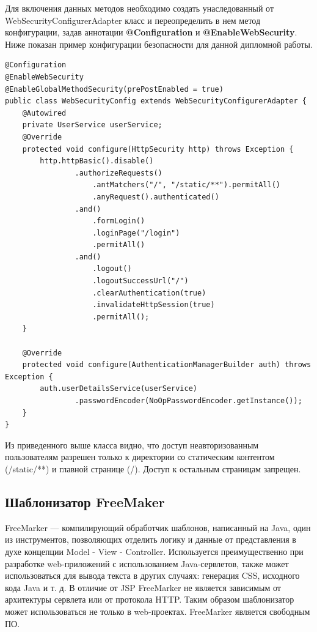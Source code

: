 \documentclass[a4paper]{article}
\begin{document}
Для включения данных методов необходимо создать унаследованный от WebSecurityConfigurerAdapter класс и переопределить в нем метод конфигурации, задав аннотации \textbf{@Configuration} и \textbf{@EnableWebSecurity}. Ниже показан пример конфигурации безопасности для данной дипломной работы.
\hfill\break
{}         
\begin{lstlisting}[label=lis8,caption=Класс настроек безопасности] 
@Configuration
@EnableWebSecurity
@EnableGlobalMethodSecurity(prePostEnabled = true)
public class WebSecurityConfig extends WebSecurityConfigurerAdapter {
    @Autowired
    private UserService userService;
    @Override
    protected void configure(HttpSecurity http) throws Exception {
        http.httpBasic().disable()
                .authorizeRequests()
                    .antMatchers("/", "/static/**").permitAll()
                    .anyRequest().authenticated()
                .and()
                    .formLogin()
                    .loginPage("/login")
                    .permitAll()
                .and()
                    .logout()
                    .logoutSuccessUrl("/")
                    .clearAuthentication(true)
                    .invalidateHttpSession(true)
                    .permitAll();
    }

    @Override
    protected void configure(AuthenticationManagerBuilder auth) throws Exception {
        auth.userDetailsService(userService)
                .passwordEncoder(NoOpPasswordEncoder.getInstance());
    }
}
\end{lstlisting}


Из приведенного выше класса видно, что доступ неавторизованным пользователям разрешен только к директории со статическим контентом (/static/**) и главной странице (/). Доступ к остальным страницам запрещен.

\subsection{Шаблонизатор FreeMaker}

FreeMarker — компилирующий обработчик шаблонов, написанный на Java, один из инструментов, позволяющих отделить логику и данные от представления в духе концепции Model - View - Controller. Используется преимущественно при разработке web-приложений с использованием Java-сервлетов, также может использоваться для вывода текста в других случаях: генерация CSS, исходного кода Java и т. д. В отличие от JSP FreeMarker не является зависимым от архитектуры сервлета или от протокола HTTP. Таким образом шаблонизатор может использоваться не только в web-проектах. FreeMarker является свободным ПО.
\end{document}

